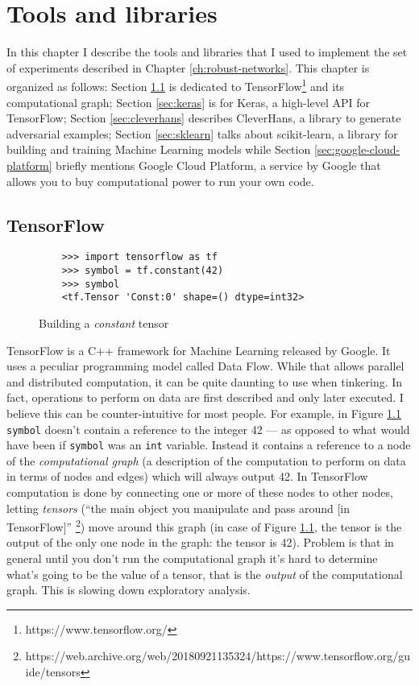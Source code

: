 \chapter{Tools and libraries}

In this chapter I describe the tools and libraries that I used to
implement the set of experiments described in Chapter
\ref{ch:robust-networks}. This chapter is organized as follows: Section
\ref{sec:tensorflow} is dedicated to
TensorFlow\footnote{https://www.tensorflow.org/} and its computational
graph; Section \ref{sec:keras} is for Keras, a high-level API for
TensorFlow; Section \ref{sec:cleverhans} describes CleverHans, a
library to generate adversarial examples; Section \ref{sec:sklearn}
talks about scikit-learn, a library for building and training Machine
Learning models while Section \ref{sec:google-cloud-platform} briefly
mentions Google Cloud Platform, a service by Google that allows you to
buy computational power to run your own code.

\section{TensorFlow}
\label{sec:tensorflow}

\begin{figure}
  \begin{verbatim}
    >>> import tensorflow as tf
    >>> symbol = tf.constant(42)
    >>> symbol
    <tf.Tensor 'Const:0' shape=() dtype=int32>
  \end{verbatim}
  \caption{Building a \emph{constant} tensor}
  \label{fig:fortytwo}
\end{figure}

TensorFlow is a C++ framework for Machine Learning released by Google.
It uses a peculiar programming model called Data Flow. While that
allows parallel and distributed computation, it can be quite daunting
to use when tinkering. In fact, operations to perform on data are first
described and only later executed. I believe this can be
counter-intuitive for most people. For example, in Figure
\ref{fig:fortytwo} \texttt{symbol} doesn't contain a reference to the
integer 42 --- as opposed to what would have been if \texttt{symbol} was
an \texttt{int} variable. Instead it contains a reference to a node of
the \emph{computational graph} (a description of the computation to
perform on data in terms of nodes and edges) which will always output
42. In TensorFlow computation is done by connecting one or more of
these nodes to other nodes, letting \emph{tensors} (``the main object
you manipulate and pass around [in TensorFlow]''%
\footnote{https://web.archive.org/web/20180921135324/https://www.tensorflow.org/guide/tensors})
move around this graph (in case of Figure \ref{fig:fortytwo}, the
tensor is the output of the only one node in the graph: the tensor is
42). Problem is that in general until you don't run the computational
graph it's hard to determine what's going to be the value of a tensor,
that is the \emph{output} of the computational graph. This is slowing
down exploratory analysis.

